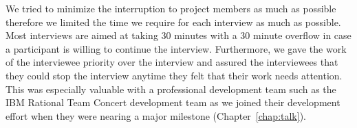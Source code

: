 We tried to minimize the interruption to project members as much as possible therefore we limited the time we require for each interview as much as possible.
Most interviews are aimed at taking 30 minutes with a 30 minute overflow in case a participant is willing to continue the interview.
Furthermore, we gave the work of the interviewee priority over the interview and assured the interviewees that they could stop the interview anytime they felt that their work needs attention.
This was especially valuable with a professional development team such as the IBM Rational Team Concert development team as we joined their development effort when they were nearing a major milestone (Chapter~\ref{chap:talk}).










